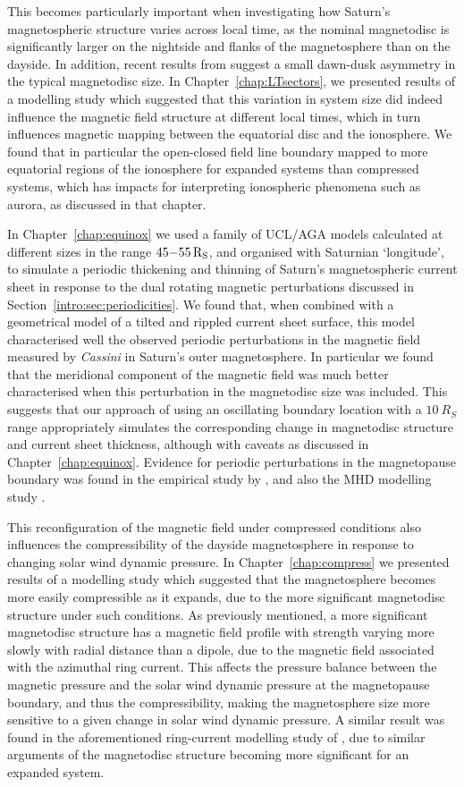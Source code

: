 This becomes particularly important when investigating how Saturn's magnetospheric structure varies across local time, as the nominal magnetodisc is significantly larger on the nightside and flanks of the magnetosphere than on the dayside. In addition, recent results from \citet{pilkington2015b} suggest a small dawn-dusk asymmetry in the typical magnetodisc size. In Chapter~\ref{chap:LTsectors}, we presented results of a modelling study which suggested that this variation in system size did indeed influence the magnetic field structure at different local times, which in turn influences magnetic mapping between the equatorial disc and the ionosphere. We found that in particular the open-closed field line boundary mapped to more equatorial regions of the ionosphere for expanded systems than compressed systems, which has impacts for interpreting ionospheric phenomena such as aurora, as discussed in that chapter.

In Chapter~\ref{chap:equinox} we used a family of UCL/AGA models calculated at different sizes in the range $45{\--}\SI{55}{R_S}$, and organised with Saturnian `longitude',  to simulate a periodic thickening and thinning of Saturn's magnetospheric current sheet in response to the dual rotating magnetic perturbations discussed in Section~\ref{intro:sec:periodicities}. We found that, when combined with a geometrical model of a tilted and rippled current sheet surface, this model characterised well the observed periodic perturbations in the magnetic field measured by \textit{Cassini} in Saturn's outer magnetosphere. In particular we found that the meridional component of  the magnetic field was much better characterised when this perturbation in the magnetodisc size was included. This suggests that our approach of using an oscillating boundary location with a $\SI{10}{R_S}$ range appropriately simulates the corresponding change in magnetodisc structure and current sheet thickness, although with caveats as discussed in Chapter~\ref{chap:equinox}. Evidence for periodic perturbations in  the magnetopause boundary was found in the empirical study by \citet{clarke2010}, and also the MHD modelling study \citet{kivelson2014}.

This reconfiguration of the magnetic field under compressed conditions also influences the compressibility of the dayside magnetosphere in response to changing solar wind dynamic pressure. In Chapter~\ref{chap:compress} we presented results of a modelling study which suggested that the magnetosphere becomes more easily compressible as it expands, due to the more significant magnetodisc structure under such conditions. As previously mentioned, a more significant magnetodisc structure has a magnetic field profile  with strength varying more slowly with radial distance than a  dipole, due to the magnetic field associated with the azimuthal ring current. This affects the pressure balance between the magnetic pressure and the solar wind dynamic pressure at the magnetopause boundary, and thus the compressibility, making the magnetosphere size more sensitive to a given change in solar wind dynamic pressure. A similar result was found in the aforementioned ring-current modelling study of \citet{bunce2007}, due to similar arguments of the magnetodisc structure becoming more significant for an expanded system.

